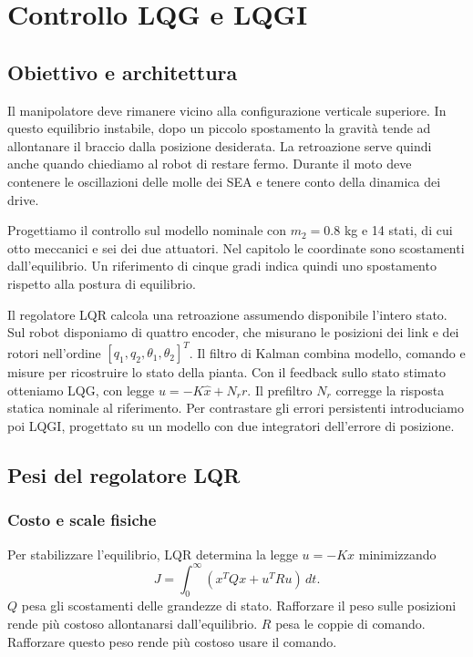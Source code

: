 \chapter{Controllo LQG e LQGI}
\section{Obiettivo e architettura}

Il manipolatore deve rimanere vicino alla configurazione verticale superiore.
In questo equilibrio instabile, dopo un piccolo spostamento la gravità tende
ad allontanare il braccio dalla posizione desiderata. La retroazione serve
quindi anche quando chiediamo al robot di restare fermo. Durante il moto
deve contenere le oscillazioni delle molle dei SEA e tenere conto della
dinamica dei drive.

Progettiamo il controllo sul modello nominale con $m_2=0.8$ kg e 14 stati,
di cui otto meccanici e sei dei due attuatori. Nel capitolo le coordinate
sono scostamenti dall'equilibrio. Un riferimento di cinque gradi indica
quindi uno spostamento rispetto alla postura di equilibrio.

Il regolatore LQR calcola una retroazione assumendo disponibile l'intero
stato. Sul robot disponiamo di quattro encoder, che misurano le posizioni
dei link e dei rotori nell'ordine $[q_1,q_2,\theta_1,\theta_2]^T$.
Il filtro di Kalman combina modello, comando e misure per ricostruire lo
stato della pianta. Con il feedback sullo stato stimato otteniamo LQG,
con legge $u=-K\hat x+N_rr$. Il prefiltro $N_r$ corregge la risposta
statica nominale al riferimento. Per contrastare gli errori persistenti
introduciamo poi LQGI, progettato su un modello con due integratori
dell'errore di posizione.

\section{Pesi del regolatore LQR}

\subsection{Costo e scale fisiche}

Per stabilizzare l'equilibrio, LQR determina la legge $u=-Kx$ minimizzando
\[
J=\int_0^\infty \left(x^TQx+u^TRu\right)\,dt.
\]
$Q$ pesa gli scostamenti delle grandezze di stato. Rafforzare il peso sulle
posizioni rende più costoso allontanarsi dall'equilibrio. $R$ pesa le coppie
di comando. Rafforzare questo peso rende più costoso usare il comando.

